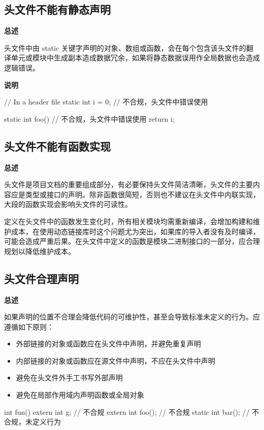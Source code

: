 \subsection{头文件不能有静态声明}

\textbf{总述}

头文件中由 static 关键字声明的对象、数组或函数，会在每个包含该头文件的翻译单元或模块中生成副本造成数据冗余，如果将静态数据误用作全局数据也会造成逻辑错误。

\textbf{说明}

\begin{ccode}
// In a header file
static int i = 0;   // 不合规，头文件中错误使用

static int foo() {  // 不合规，头文件中错误使用
    return i;
}
\end{ccode}

\subsection{头文件不能有函数实现}

\textbf{总述}

头文件是项目文档的重要组成部分，有必要保持头文件简洁清晰，头文件的主要内容应是类型或接口的声明。除非函数很简短，否则也不建议在头文件中内联实现，大段的函数实现会影响头文件的可读性。

定义在头文件中的函数发生变化时，所有相关模块均需重新编译，会增加构建和维护成本，在使用动态链接库时这个问题尤为突出，如果库的导入者没有及时编译，可能会造成严重后果。在头文件中定义的函数是模块二进制接口的一部分，应合理规划以降低维护成本。

\subsection{头文件合理声明}

\textbf{总述}

如果声明的位置不合理会降低代码的可维护性，甚至会导致标准未定义的行为。应遵循如下原则：

\begin{itemize}
    \item 外部链接的对象或函数应在头文件中声明，并避免重复声明
    \item 内部链接的对象或函数应在源文件中声明，不应在头文件中声明
    \item 避免在头文件外手工书写外部声明
    \item 避免在局部作用域内声明函数或全局对象
\end{itemize}

\begin{ccode}

int fun()
{
    extern int g;       // 不合规
    extern int foo();   // 不合规
    static int bar();   // 不合规，未定义行为
}
\end{ccode}